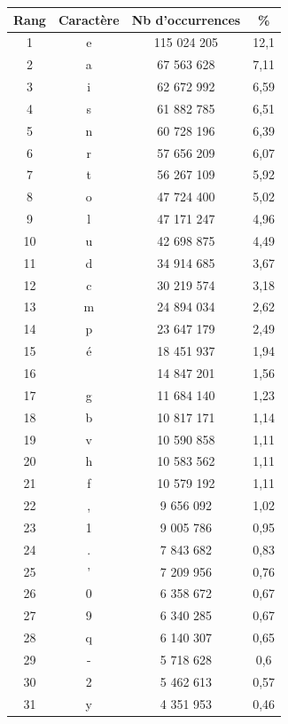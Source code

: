 \documentclass[a4paper,12pt,titlepage]{report}
\begin{document}
\begin{table}
\begin{tabular}{|c|c|c|c|}
\hline
\textbf{Rang} & \textbf{Caractère} & \textbf{Nb d'occurrences} & \textbf{\%} \\
\hline
1 &	e &	115 024 205 & 12,1 \\
\hline
2 &	a &	67 563 628 & 7,11 \\
\hline
3 &	i &	62 672 992 & 6,59 \\
\hline
4 &	s &	61 882 785 & 6,51 \\
\hline
5 &	n &	60 728 196 & 6,39 \\
\hline
6 &	r &	57 656 209 & 6,07 \\
\hline
7 &	t &	56 267 109 & 5,92 \\
\hline
8 &	o &	47 724 400 & 5,02 \\
\hline
9 &	l &	47 171 247 & 4,96 \\
\hline
10 & u & 42 698 875 & 4,49 \\
\hline
11 & d & 34 914 685 & 3,67 \\
\hline
12 & c & 30 219 574 & 3,18 \\
\hline
13 & m & 24 894 034 & 2,62 \\
\hline
14 & p & 23 647 179 & 2,49 \\
\hline
15 & é & 18 451 937 & 1,94 \\
\hline
16 &   & 14 847 201 & 1,56 \\
\hline
17 & g & 11 684 140 & 1,23 \\
\hline
18 & b & 10 817 171 & 1,14 \\
\hline
19 & v & 10 590 858 & 1,11 \\ 
\hline
20 & h & 10 583 562 & 1,11 \\ 
\hline
21 & f & 10 579 192 & 1,11 \\
\hline
22 & , &  9 656 092 & 1,02 \\
\hline
23 & 1 &  9 005 786 & 0,95 \\
\hline
24 & . &  7 843 682 & 0,83 \\
\hline
25 & ' &  7 209 956 & 0,76 \\
\hline
26 & 0 &  6 358 672 & 0,67 \\
\hline
27 & 9 &  6 340 285 & 0,67 \\
\hline
28 & q &  6 140 307 & 0,65 \\
\hline
29 & - &  5 718 628 & 0,6  \\
\hline
30 & 2 &  5 462 613 & 0,57 \\
\hline
31 & y &  4 351 953 & 0,46 \\

\end{tabular}
\end{table}
\end{document}
